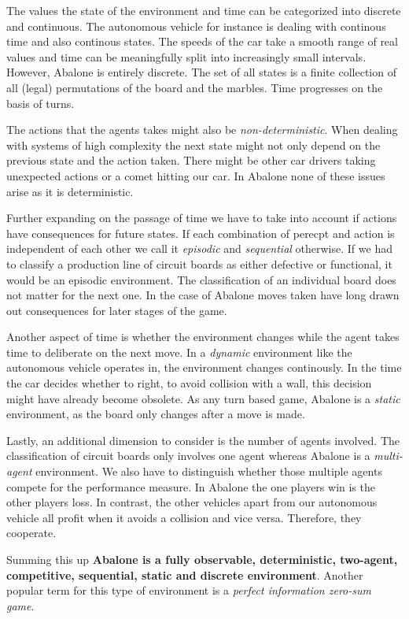 The values the state of the environment and time can be categorized into discrete and continuous. The autonomous vehicle for instance is dealing with continous time and also continous states. The speeds of the car take a smooth range of real values and time can be meaningfully split into increasingly small intervals. However, Abalone is entirely discrete. The set of all states is a finite collection of all (legal) permutations of the board and the marbles. Time progresses on the basis of turns.

The actions that the agents takes might also be \textit{non-deterministic}. When dealing with systems of high complexity the next state might not only depend on the previous state and the action taken. There might be other car drivers taking unexpected actions or a comet hitting our car. In Abalone none of these issues arise as it is deterministic.

Further expanding on the passage of time we have to take into account if actions have consequences for future states. If each combination of perecpt and action is independent of each other we call it \textit{episodic} and \textit{sequential} otherwise. If we had to classify a production line of circuit boards as either defective or functional, it would be an episodic environment. The classification of an individual board does not matter for the next one. In the case of Abalone moves taken have long drawn out consequences for later stages of the game.

Another aspect of time is whether the environment changes while the agent takes time to deliberate on the next move. In a \textit{dynamic} environment like the autonomous vehicle operates in, the environment changes continously. In the time the car decides whether to right, to avoid collision with a wall, this decision might have already become obsolete. As any turn based game, Abalone is a \textit{static} environment, as the board only changes after a move is made.

Lastly, an additional dimension to consider is the number of agents involved. The classification of circuit boards only involves one agent whereas Abalone is a \textit{multi-agent} environment. We also have to distinguish whether those multiple agents compete for the performance measure. In Abalone the one players win is the other players loss. In contrast, the other vehicles apart from our autonomous vehicle all profit when it avoids a collision and vice versa. Therefore, they cooperate.

Summing this up \textbf{Abalone is a fully observable, deterministic, two-agent, competitive, sequential, static and discrete environment}. Another popular term for this type of environment is a \textit{perfect information zero-sum game}.

